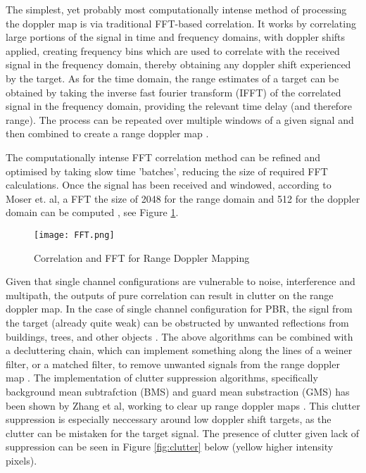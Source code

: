 The simplest, yet probably most computationally intense method of processing the doppler map is via traditional FFT-based correlation. It works by correlating large portions of the signal in time and frequency domains, with doppler shifts applied, creating frequency bins which are used to correlate with the received signal in the frequency domain, thereby obtaining any doppler shift experienced by the target. As for the time domain, the range estimates of a target can be obtained by taking the inverse fast fourier transform (IFFT) of the correlated signal in the frequency domain, providing the relevant time delay (and therefore range). The process can be repeated over multiple windows of a given signal and then combined to create a range doppler map \cite{FFTcorrelation}.



\par \vspace{0.5cm} 
\noindent The computationally intense FFT correlation method can be refined and optimised by taking slow time 'batches', reducing the size of required FFT calculations. Once the signal has been received and windowed, according to Moser et. al, a FFT the size of 2048 for the range domain and 512 for the doppler domain can be computed \cite{IOTpassiveRadar}, see Figure \ref{fig:FFT}. 

\begin{figure}[htbp]
    \centering
    \texttt{[image: FFT.png]}
    \caption{Correlation and FFT for Range Doppler Mapping \cite{IOTpassiveRadar}}
    \label{fig:FFT}
\end{figure}

Given that single channel configurations are vulnerable to noise, interference and multipath, the outputs of pure correlation can result in clutter on the range doppler map. In the case of single channel configuration for PBR, the signl from the target (already quite weak) can be obstructed by unwanted reflections from buildings, trees, and other objects \cite{INTRO2017}. The above algorithms can be combined with a decluttering chain, which can implement something along the lines of a weiner filter, or a matched filter, to remove unwanted signals from the range doppler map \cite{FundamentalsPassiveRadar}. The implementation of clutter suppression algorithms, specifically background mean subtrafction (BMS) and guard mean substraction (GMS) has been shown by Zhang et al, working to clear up range doppler maps \cite{ZhangClutter}. This clutter suppression is especially neccessary around low doppler shift targets, as the clutter can be mistaken for the target signal. The presence of clutter given lack of suppression can be seen in Figure \ref{fig:clutter} below (yellow higher intensity pixels).

